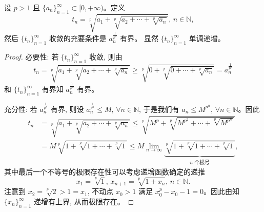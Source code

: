 \documentclass[../../main.tex]{subfiles}%
\begin{document}
\begin{example}[Herschfeld判别法]

设 \( p > 1 \) 且 \( \{a_n\}_{n = 1}^{\infty} \subset [0, +\infty) \)。定义
\[
t_n = \sqrt[p]{a_1 + \sqrt[p]{a_2 + \cdots + \sqrt[p]{a_n}}}, \, n \in \mathbb{N},
\]
然后 \( \{t_n\}_{n = 1}^{\infty} \) 收敛的充要条件是 \( a_n^{\frac{1}{p^n}} \) 有界。
显然 \( \{t_n\}_{n = 1}^{\infty} \) 单调递增。
\end{example}
\begin{proof}

{\heiti 必要性:} 若 \( \{t_n\}_{n = 1}^{\infty} \) 收敛, 则由
\[
t_n = \sqrt[p]{a_1 + \sqrt[p]{a_2 + \cdots + \sqrt[p]{a_n}}} \geqslant \sqrt[p]{0 + \sqrt[p]{0 + \cdots + \sqrt[p]{a_n}}} = a_n^{\frac{1}{p^n}}
\]
和 \( \{t_n\}_{n = 1}^{\infty} \) 有界知 \( a_n^{\frac{1}{p^n}} \) 有界。

{\heiti 充分性:} 若 \( a_n^{\frac{1}{p^n}} \) 有界, 则设 \( a_n^{\frac{1}{p^n}} \leqslant M, \, \forall n \in \mathbb{N} \), 于是我们有 \( a_n \leqslant M^{p^n}, \, \forall n \in \mathbb{N} \)。因此
\begin{align*}
t_n &= \sqrt[p]{a_1 + \sqrt[p]{a_2 + \cdots + \sqrt[p]{a_n}}} \leqslant \sqrt[p]{M^{p} + \sqrt[p]{M^{p^2} + \cdots + \sqrt[p]{M^{p^n}}}} \\
&= M\sqrt[p]{1 + \sqrt[p]{1 + \cdots + \sqrt[p]{1}}} \leqslant M \lim_{n \to \infty} \underbrace{\sqrt[p]{1 + \sqrt[p]{1 + \cdots + \sqrt[p]{1}}}}_{n \text{ 个根号}},
\end{align*}
其中最后一个不等号的极限存在性可以考虑递增函数确定的递推
\[
x_1 = \sqrt[p]{1}, \, x_{n + 1} = \sqrt[p]{1 + x_n}, \, n \in \mathbb{N}.
\]
注意到 \( x_2 = \sqrt[p]{2} > 1 = x_1 \), 不动点 \( x_0 > 1 \) 满足 \( x_0^p - x_0 - 1 = 0 \)。因此由知 \( \{x_n\}_{n = 1}^{\infty} \) 递增有上界, 从而极限存在。

\end{proof}
\end{document}
